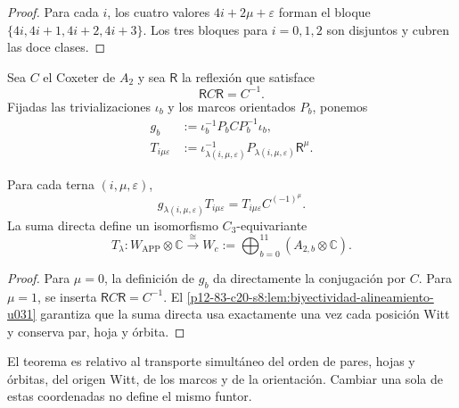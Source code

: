 \begin{proof}
Para cada \(i\), los cuatro valores \(4i+2\mu+\varepsilon\) forman el bloque
\(\{4i,4i+1,4i+2,4i+3\}\). Los tres bloques para \(i=0,1,2\) son disjuntos
y cubren las doce clases.
\end{proof}

Sea \(C\) el Coxeter de \(A_2\) y sea \(\mathsf R\) la reflexión que
satisface
\begin{equation}
 \mathsf R C\mathsf R=C^{-1}.
 \label{p12-83-c20-s8:eq:reflexion-conjuga-coxeter-u031}
\end{equation}
Fijadas las trivializaciones \(\iota_b\) y los marcos orientados \(P_b\),
ponemos
\begin{align}
 g_b&:=\iota_b^{-1}P_bCP_b^{-1}\iota_b,
 \label{p12-83-c20-s8:eq:coxeter-calibrado-fibra-u031}\\
 T_{i\mu\varepsilon}
 &:=\iota_{\lambda(i,\mu,\varepsilon)}^{-1}
 P_{\lambda(i,\mu,\varepsilon)}\mathsf R^\mu.
 \label{p12-83-c20-s8:eq:entrelazador-fibra-u031}
\end{align}

\begin{theorem}
\label{p12-83-c20-s8:thm:alineamiento-app-witt-u031}
Para cada terna \((i,\mu,\varepsilon)\),
\begin{equation}
 g_{\lambda(i,\mu,\varepsilon)}T_{i\mu\varepsilon}
 =T_{i\mu\varepsilon}C^{(-1)^\mu}.
 \label{p12-83-c20-s8:eq:identidad-entrelazamiento-app-witt-u031}
\end{equation}
La suma directa define un isomorfismo \(C_3\)-equivariante
\begin{equation}
 T_\lambda:
 W_{\mathrm{APP}}\otimes\mathbb C
 \xrightarrow{\;\cong\;}
 W_c:=\bigoplus_{b=0}^{11}
 (A_{2,b}\otimes\mathbb C).
 \label{p12-83-c20-s8:eq:isomorfismo-app-witt-u031}
\end{equation}
\end{theorem}

\begin{proof}
Para \(\mu=0\), la definición de \(g_b\) da directamente la conjugación
por \(C\). Para \(\mu=1\), se inserta
\(\mathsf RC\mathsf R=C^{-1}\). El
\cref{p12-83-c20-s8:lem:biyectividad-alineamiento-u031} garantiza que la suma directa
usa exactamente una vez cada posición Witt y conserva par, hoja y órbita.
\end{proof}

El teorema es relativo al transporte simultáneo del orden de pares, hojas y
órbitas, del origen Witt, de los marcos y de la orientación. Cambiar una
sola de estas coordenadas no define el mismo funtor.

